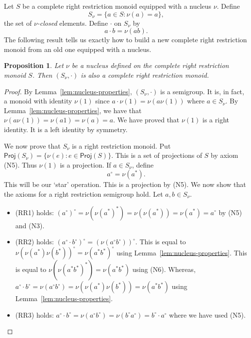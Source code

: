 \documentclass[a4paper]{amsart}
\newtheorem{proposition}[theorem]{Proposition}
\begin{document}
Let $S$ be a complete right restriction monoid equipped with a nucleus $\nu$.
Define
$$S_{\nu} = \{a \in S \colon \nu (a) = a\},$$
the set of {\em $\nu$-closed} elements.
Define $\cdot$ on $S_{\nu}$ by
$$a \cdot b = \nu (ab).$$ 
The following result tells us exactly how to build a new complete right restriction monoid
from an old one equipped with a nucleus.

\begin{proposition}\label{prop:as} Let $\nu$ be a nucleus defined on the complete right restriction monoid $S$.
Then $(S_{\nu},\cdot)$ is also a complete right restriction monoid.
\end{proposition}
\begin{proof} By Lemma~\ref{lem:nucleus-properties}, $(S_{\nu},\cdot)$ is a semigroup.
It is, in fact, a monoid with identity $\nu (1)$
since
$a \cdot \nu (1) = \nu (a \nu (1))$
where $a \in S_{\nu}$.
By Lemma~\ref{lem:nucleus-properties},
we have that $\nu (a \nu (1)) = \nu (a1) = \nu (a) = a$.
We have proved that $\nu(1)$ is a right identity.
It is a left identity by symmetry.

We now prove that $S_{\nu}$ is a right restriction monoid.
Put $\mathsf{Proj} (S_{\nu}) = \{\nu (e) \colon e \in \mathsf{Proj}(S)\}$.
This is a set of projections of $S$ by axiom (N5).
Thus $\nu (1)$ is a projection.
If $a \in S_{\nu}$, define 
$$a^{\circ} = \nu (a^{\ast}).$$
This will be our `star' operation.
This is a projection by (N5).
We now show that the axioms for a right restriction semigroup hold.
Let $a,b \in S_{\nu}$.

\begin{itemize}

\item (RR1) holds:
$(a^{\circ})^{\circ} = \nu (\nu (a^{\ast})^{\ast}) = \nu (\nu (a^{\ast})) = \nu (a^{\ast}) = a^{\circ}$
by (N5) and (N3).

\item (RR2) holds: $(a^{\circ} \cdot b^{\circ})^{\circ} = (\nu(a^{\circ}b^{\circ}))^{\circ}$.
This is equal to $\nu (\nu(a^{\ast})\nu(b^{\ast}))^{\circ} = \nu (a^{\ast}b^{\ast})^{\circ}$ using Lemma~\ref{lem:nucleus-properties}.
This is equal to $\nu (\nu (a^{\ast}b^{\ast})^{\ast}) = \nu (a^{\ast}b^{\ast})$ using (N6).
Whereas, $a^{\circ} \cdot b^{\circ} = \nu (a^{\circ}b^{\circ}) = \nu (\nu (a^{\ast}) \nu (b^{\ast})) = \nu (a^{\ast}b^{\ast})$
using  Lemma~\ref{lem:nucleus-properties}.

\item (RR3) holds: $a^{\circ} \cdot b^{\circ} = \nu (a^{\circ}b^{\circ}) = \nu (b^{\circ}a^{\circ}) = b^{\circ} \cdot a^{\circ}$
where we have used (N5).


\end{itemize}
\end{proof}
\end{document}
